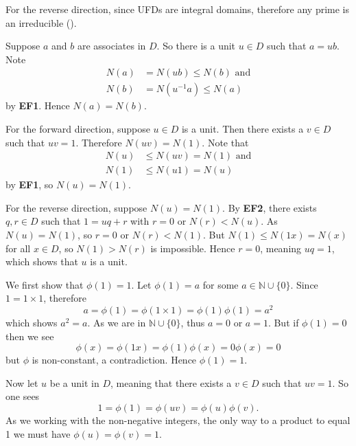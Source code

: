 \begin{questions}
    For the reverse direction, since UFDs are integral domains, therefore any prime is an irreducible ().

    \item \begin{partquestions}{\alph*}
        \item Suppose $a$ and $b$ are associates in $D$. So there is a unit $u \in D$ such that $a = ub$. Note
        \begin{align*}
            N(a) &= N(ub) \leq N(b) \text{ and}\\
            N(b) &= N(u^{-1}a) \leq N(a)
        \end{align*}
        by \textbf{EF1}. Hence $N(a) = N(b)$.

        \item For the forward direction, suppose $u \in D$ is a unit. Then there exists a $v \in D$ such that $uv = 1$. Therefore $N(uv) = N(1)$. Note that
        \begin{align*}
            N(u) &\leq N(uv) = N(1) \text{ and}\\
            N(1) &\leq N(u1) = N(u)
        \end{align*}
        by \textbf{EF1}, so $N(u) = N(1)$.

        For the reverse direction, suppose $N(u) = N(1)$. By \textbf{EF2}, there exists $q, r \in D$ such that $1 = uq + r$ with $r = 0$ or $N(r) < N(u)$. As $N(u) = N(1)$, so $r = 0$ or $N(r) < N(1)$. But $N(1) \leq N(1x) = N(x)$ for all $x \in D$, so $N(1) > N(r)$ is impossible. Hence $r = 0$, meaning $uq = 1$, which shows that $u$ is a unit.
    \end{partquestions}

    \item We first show that $\phi(1) = 1$. Let $\phi(1) = a$ for some $a \in \mathbb{N} \cup \{0\}$. Since $1 = 1 \times 1$, therefore
    \[
        a = \phi(1) = \phi(1 \times 1) = \phi(1)\phi(1) = a^2
    \]
    which shows $a^2 = a$. As we are in $\mathbb{N} \cup \{0\}$, thus $a = 0$ or $a = 1$. But if $\phi(1) = 0$ then we see
    \[
        \phi(x) = \phi(1x) = \phi(1)\phi(x) = 0\phi(x) = 0
    \]
    but $\phi$ is non-constant, a contradiction. Hence $\phi(1) = 1$.

    Now let $u$ be a unit in $D$, meaning that there exists a $v \in D$ such that $uv = 1$. So one sees
    \[
        1 = \phi(1) = \phi(uv) = \phi(u)\phi(v).
    \]
    As we working with the non-negative integers, the only way to a product to equal 1 we must have $\phi(u) = \phi(v) = 1$.


\end{questions}
